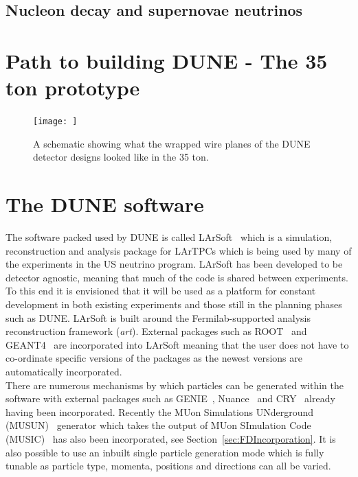 \subsection{Nucleon decay and supernovae neutrinos}  %

\section{Path to building DUNE - The 35 ton prototype} \label{sec:The35tonDetector}  %

\begin{figure}[h]
  \centering
  \texttt{[image: ]}
  \caption[The wrapped wires of the 35 ton]{A schematic showing what the wrapped wire planes of the DUNE detector designs looked like in the 35 ton.}
  \label{fig:35tonWireGeom}
\end{figure}

\section{The DUNE software} \label{sec:LArSoft} %
The software packed used by DUNE is called LArSoft~\citep{Church_LArSoft} which is a simulation, reconstruction and analysis package for LArTPCs which is being used by many of the experiments in the US neutrino program. LArSoft has been developed to be detector agnostic, meaning that much of the code is shared between experiments. To this end it is envisioned that it will be used as a platform for constant development in both existing experiments and those still in the planning phases such as DUNE. LArSoft is built around the Fermilab-supported analysis reconstruction framework (\emph{art}). External packages such as ROOT~\citep{ROOT} and GEANT4~\citep{GEANT4} are incorporated into LArSoft meaning that the user does not have to co-ordinate specific versions of the packages as the newest versions are automatically incorporated. \\

There are numerous mechanisms by which particles can be generated within the software with external packages such as GENIE~\citep{GENIE}, Nuance~\citep{Nuance} and CRY~\citep{CRY} already having been incorporated. Recently the MUon Simulations UNderground (MUSUN)~\citep{MUSUN} generator which takes the output of MUon SImulation Code (MUSIC)~\citep{MUSIC} has also been incorporated, see Section~\ref{sec:FDIncorporation}. It is also possible to use an inbuilt single particle generation mode which is fully tunable as particle type, momenta, positions and directions can all be varied. \\

